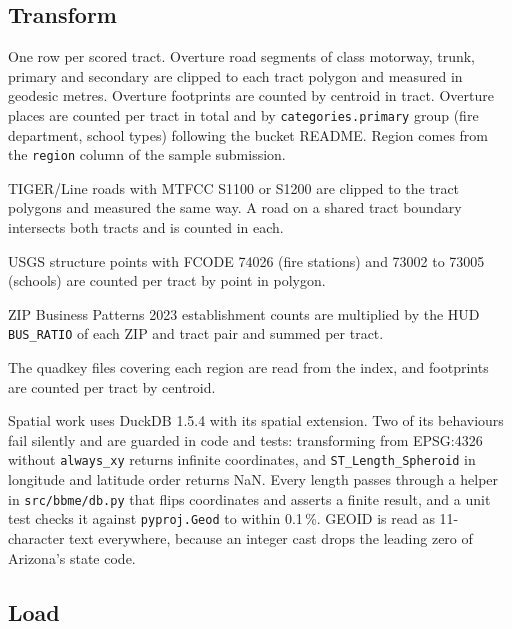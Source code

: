 \documentclass[11pt]{article}
\begin{document}
\subsection{Transform}

\begin{description}[leftmargin=0pt, itemsep=4pt]
\item[Stage 02, features.] One row per scored tract. Overture road segments
of class motorway, trunk, primary and secondary are clipped to each tract
polygon and measured in geodesic metres. Overture footprints are counted by
centroid in tract. Overture places are counted per tract in total and by
\texttt{categories.primary} group (fire department, school types) following
the bucket README. Region comes from the \texttt{region} column of the sample
submission.
\item[Stage 05, reference.] TIGER/Line roads with MTFCC S1100 or S1200 are
clipped to the tract polygons and measured the same way. A road on a shared
tract boundary intersects both tracts and is counted in each.
\item[Stage 06, facilities.] USGS structure points with FCODE 74026 (fire
stations) and 73002 to 73005 (schools) are counted per tract by point in
polygon.
\item[Stage 07, establishments.] ZIP Business Patterns 2023 establishment
counts are multiplied by the HUD \texttt{BUS\_RATIO} of each ZIP and tract
pair and summed per tract.
\item[Stage 10, Global ML.] The quadkey files covering each region are read
from the index, and footprints are counted per tract by centroid.
\end{description}

Spatial work uses DuckDB 1.5.4 with its spatial extension. Two of its
behaviours fail silently and are guarded in code and tests: transforming from
EPSG:4326 without \texttt{always\_xy} returns infinite coordinates, and
\texttt{ST\_Length\_Spheroid} in longitude and latitude order returns NaN.
Every length passes through a helper in \texttt{src/bbme/db.py} that flips
coordinates and asserts a finite result, and a unit test checks it against
\texttt{pyproj.Geod} to within 0.1\,\%. GEOID is read as 11-character text
everywhere, because an integer cast drops the leading zero of Arizona's
state code.

\subsection{Load}
\end{document}
